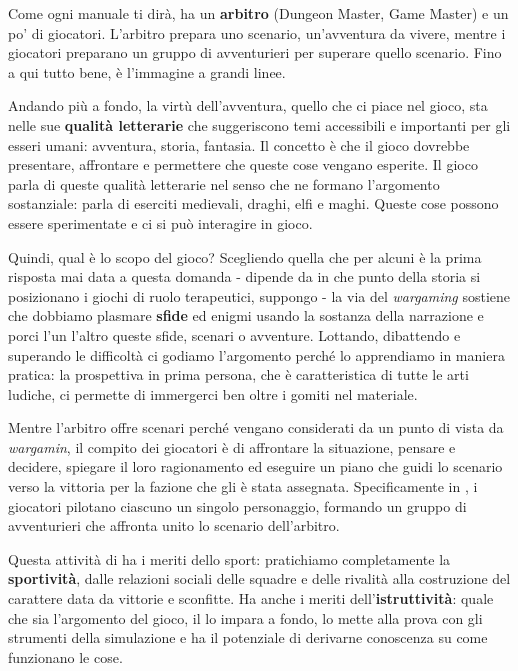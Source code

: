 
Come ogni manuale ti dirà, \dnd{} ha un \textbf{arbitro} (Dungeon Master, Game Master) e un po' di giocatori. L'arbitro prepara uno scenario, un'avventura da vivere, mentre i giocatori preparano un gruppo di avventurieri per superare quello scenario. Fino a qui tutto bene, è l'immagine a grandi linee.

Andando più a fondo, la virtù dell'avventura, quello che ci piace nel gioco, sta nelle sue \textbf{qualità letterarie} che suggeriscono temi accessibili e importanti per gli esseri umani: avventura, storia, fantasia. Il concetto è che il gioco dovrebbe presentare, affrontare e permettere che queste cose vengano esperite. Il gioco parla di queste qualità letterarie nel senso che ne formano l'argomento sostanziale: \dnd parla di eserciti medievali, draghi, elfi e maghi. Queste cose possono essere sperimentate e ci si può interagire in gioco.

Quindi, qual è lo scopo del gioco? Scegliendo quella che per alcuni è la prima risposta mai data a questa domanda - dipende da in che punto della storia si posizionano i giochi di ruolo terapeutici, suppongo - la via del \textit{wargaming} sostiene che dobbiamo plasmare \textbf{sfide} ed enigmi usando la sostanza della narrazione e porci l'un l'altro queste sfide, scenari o avventure. Lottando, dibattendo e superando le difficoltà ci godiamo l'argomento perché lo apprendiamo in maniera pratica: la prospettiva in prima persona, che è caratteristica di tutte le arti ludiche, ci permette di immergerci ben oltre i gomiti nel materiale.


Mentre l'arbitro offre scenari perché vengano considerati da un punto di vista da \textit{wargamin}, il compito dei giocatori è di affrontare la situazione, pensare e decidere, spiegare il loro ragionamento ed eseguire un piano che guidi lo scenario verso la vittoria per la fazione che gli è stata assegnata. Specificamente in \dnd{}, i giocatori pilotano ciascuno un singolo personaggio, formando un gruppo di avventurieri che affronta unito lo scenario dell'arbitro.

Questa attività di  ha i meriti dello sport: pratichiamo completamente la \textbf{sportività}, dalle relazioni sociali delle squadre e delle rivalità alla costruzione del carattere data da vittorie e sconfitte. Ha anche i meriti dell'\textbf{istruttività}: quale che sia l'argomento del gioco, il  lo impara a fondo, lo mette alla prova con gli strumenti della simulazione e ha il potenziale di derivarne conoscenza su come funzionano le cose.

